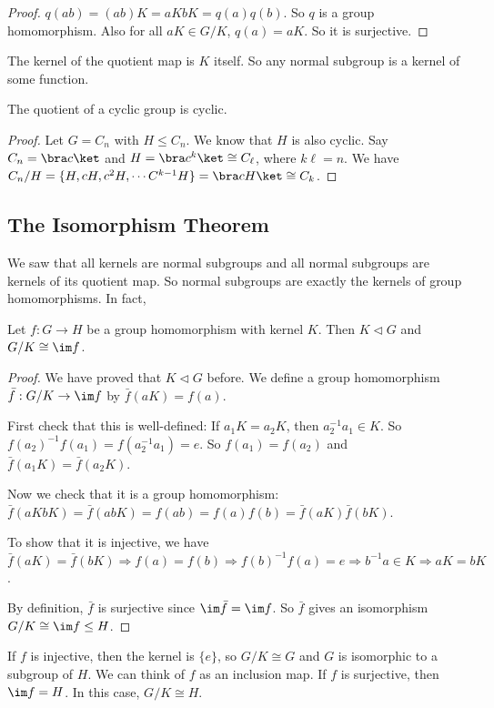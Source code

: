 \documentclass[a4paper]{article}
\begin{document}
  \begin{proof}
    $q(ab) = (ab)K = aKbK = q(a)q(b)$. So $q$ is a group homomorphism. Also for all $aK \in G/K$, $q(a) = aK$. So it is surjective. 
  \end{proof}
  \note The kernel of the quotient map is $K$ itself. So any normal subgroup is a kernel of some function.

  \begin{prop}
    The quotient of a cyclic group is cyclic.
  \end{prop}

  \begin{proof}
    Let $G = C_n$ with $H\leq C_n$. We know that $H$ is also cyclic. Say $C_n = \bra c\ket$ and $H = \bra c^k \ket \cong C_\ell$, where $k\ell = n$. We have $C_n/H = \{H, cH, c^2H, \cdots C^{k - 1}H\}=\bra cH\ket \cong C_k$.
  \end{proof}

  \subsection{The Isomorphism Theorem}
  We saw that all kernels are normal subgroups and all normal subgroups are kernels of its quotient map. So normal subgroups are exactly the kernels of group homomorphisms. In fact,
  \begin{thm}
    Let $f:G\to H$ be a group homomorphism with kernel $K$. Then $K\lhd G$ and $G/K\cong \im f$.
  \end{thm}

  \begin{proof}
    We have proved that $K\lhd G$ before. We define a group homomorphism $\bar f: G/K\to \im f$ by $\bar f(aK) = f(a)$.

    First check that this is well-defined: If $a_1K = a_2K$, then $a_2^{-1}a_1\in K$. So $f(a_2)^{-1}f(a_1) = f(a_2^{-1}a_1) = e$. So $f(a_1) = f(a_2)$ and $\bar f(a_1K) = \bar f(a_2 K)$.

    Now we check that it is a group homomorphism: $\bar f(aKbK) = \bar f(abK) = f(ab) = f(a)f(b) = \bar f(aK) \bar f(bK)$.

    To show that it is injective, we have $\bar f(aK) = \bar f(bK) \Rightarrow f(a) = f(b) \Rightarrow f(b)^{-1}f(a)=e\Rightarrow b^{-1}a\in K \Rightarrow aK = bK$.

    By definition, $\bar f$ is surjective since $\im \bar f = \im f$. So $\bar f$ gives an isomorphism $G/K \cong \im f \leq H$.
  \end{proof}
  \note If $f$ is injective, then the kernel is $\{e\}$, so $G/K\cong G$ and $G$ is isomorphic to a subgroup of $H$. We can think of $f$ as an inclusion map.
  \note If $f$ is surjective, then $\im f = H$. In this case, $G/K \cong H$.
\end{document}
